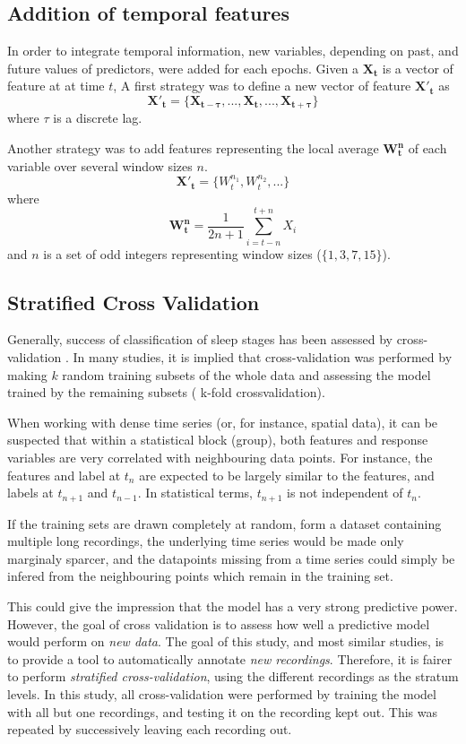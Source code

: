 \subsection{Addition of temporal features}
In order to integrate temporal information, new variables, depending on past, and future values of predictors, were added for each epochs.
Given a $\mathbf{X_t}$ is a vector of feature at at time $t$,
A first strategy was to define a new vector of feature $\mathbf{{X'}_t}$ as
\[
\mathbf{{X'}_t} = \{\mathbf{X_{t-\tau}}, ..., \mathbf{X_t}, ..., \mathbf{X_{t+\tau}}\}
\]
where $\tau$ is a discrete lag.

Another strategy was to add features representing the local average $\mathbf{W^n_t}$ of each variable over several window sizes $n$.
\[
\mathbf{{X'}_t} = \{W^{n_1}_t, W^{n_2}_t, ...\}
\]
where
\[
\mathbf{W^n_t} = \frac{1}{2n+1} \sum_{i = t-n}^{t+n}{X_i}
\]
and $n$ is a set of odd integers representing window sizes (\eg $\{1,3,7,15\}$).





\subsection{Stratified Cross Validation}
Generally, success of classification of sleep stages has been assessed by cross-validation \citationneeded{}.
In many studies, it is implied that cross-validation was performed by making $k$ random training subsets 
of the whole data and assessing the model trained by the remaining subsets (\ie{} k-fold crossvalidation).

When working with dense time series (or, for instance, spatial data), it can be suspected that within a statistical block (group),
both features and response variables are very correlated with neighbouring data points.
For instance, the features and label at $t_n$ are expected to be largely similar to the features, and labels at $t_{n+1}$ and $t_{n-1}$.
In statistical terms, $t_{n+1}$ is not independent of $t_{n}$.

If the training sets are drawn completely at random, form a dataset containing multiple long recordings, 
the underlying time series would be made only marginaly sparcer, and the datapoints missing from
a time series could simply be infered from the neighbouring points which remain in the training set.

This could give the impression that the model has a very strong predictive power.
However, the goal of cross validation is to assess how well a predictive model would perform on \emph{new data}. 
The goal of this study, and most similar studies, is to provide a tool to automatically annotate \emph{new recordings}. 
Therefore, it is fairer to perform \emph{stratified cross-validation}, using the different recordings as the stratum levels.
In this study, all cross-validation were performed by training the model with all but one recordings,
and testing it on the recording kept out. This was repeated by successively leaving each recording out.


